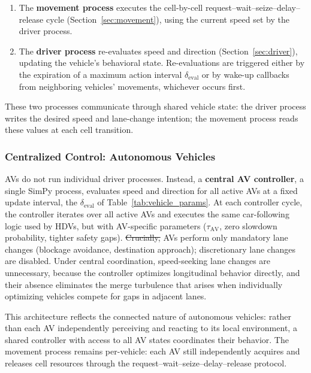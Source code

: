 \documentclass[review,authoryear]{elsarticle}
\providecommand{\DIFdeltex}[1]{{\protect\color{red}\sout{#1}}}                      %
\providecommand{\DIFdelbegin}{} %
\providecommand{\DIFdelend}{} %
\providecommand{\DIFdel}[1]{\texorpdfstring{\DIFdeltex{#1}}{}} %
\newcommand{\DIFscaledelfig}{0.5}
\newlength{\DIFdelgraphicswidth} %
\newlength{\DIFdelgraphicsheight} %
\newcommand{\DIFdelincludegraphics}[2][]{%
\sbox{\DIFdelgraphicsbox}{\DIFOincludegraphics[#1]{#2}}%
\settoboxwidth{\DIFdelgraphicswidth}{\DIFdelgraphicsbox} %
\settoboxtotalheight{\DIFdelgraphicsheight}{\DIFdelgraphicsbox} %
\scalebox{\DIFscaledelfig}{%
\parbox[b]{\DIFdelgraphicswidth}{\usebox{\DIFdelgraphicsbox}\\[-\baselineskip] \rule{\DIFdelgraphicswidth}{0em}}\llap{\resizebox{\DIFdelgraphicswidth}{\DIFdelgraphicsheight}{%
\setlength{\unitlength}{\DIFdelgraphicswidth}%
\begin{picture}(1,1)%
\thicklines\linethickness{2pt} %
{\color[rgb]{1,0,0}\put(0,0){\framebox(1,1){}}}%
{\color[rgb]{1,0,0}\put(0,0){\line( 1,1){1}}}%
{\color[rgb]{1,0,0}\put(0,1){\line(1,-1){1}}}%
\end{picture}%
}\hspace*{3pt}}} %
} %
\DeclareRobustCommand{\DIFdelbegin}{\DIFOdelbegin \let\includegraphics\DIFdelincludegraphics} %
\DeclareRobustCommand{\DIFdelend}{\DIFOaddend \let\includegraphics\DIFOincludegraphics} %
\begin{document}
\begin{enumerate}
    \item The \textbf{movement process} executes the cell-by-cell request--wait--seize--delay--release cycle (Section~\ref{sec:movement}), using the current speed set by the driver process.

    \item The \textbf{driver process} re-evaluates speed and direction (Section~\ref{sec:driver}), updating the vehicle's behavioral state. Re-evaluations are triggered either by the expiration of a maximum action interval $\delta_{\text{eval}}$ or by wake-up callbacks from neighboring vehicles' movements, whichever occurs first.
\end{enumerate}

These two processes communicate through shared vehicle state: the driver process writes the desired speed and lane-change intention; the movement process reads these values at each cell transition.

\subsubsection{Centralized Control: Autonomous Vehicles}
\label{sec:av_controller}

AVs do not run individual driver processes. Instead, a \textbf{central AV controller}, a single SimPy process, evaluates speed and direction for all active AVs at a fixed update interval, the $\delta_{\text{eval}}$ of Table~\ref{tab:vehicle_params}. At each controller cycle, the controller iterates over all active AVs and executes the same car-following logic used by HDVs, but with AV-specific parameters ($\tau_{\text{AV}}$, zero slowdown probability, tighter safety gaps). \DIFdelbegin \DIFdel{Crucially, }\DIFdelend AVs perform only mandatory lane changes (blockage avoidance, destination approach); discretionary lane changes are disabled. Under central coordination, speed-seeking lane changes are unnecessary, because the controller optimizes longitudinal behavior directly, and their absence eliminates the merge turbulence that arises when individually optimizing vehicles compete for gaps in adjacent lanes.

This architecture reflects the connected nature of autonomous vehicles: rather than each AV independently perceiving and reacting to its local environment, a shared controller with access to all AV states coordinates their behavior. The movement process remains per-vehicle: each AV still independently acquires and releases cell resources through the request--wait--seize--delay--release protocol.
\end{document}
